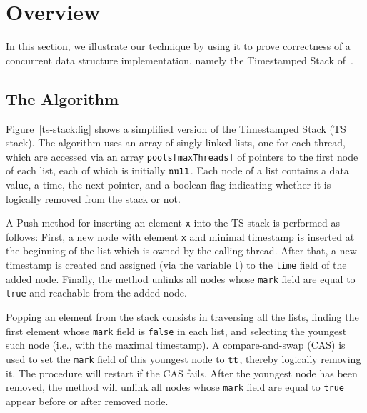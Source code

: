 \section{Overview}
\label{sec:overview}

In this section, we illustrate our technique by using it to prove correctness of
a concurrent data structure implementation, namely the Timestamped Stack
of~\cite{ts-stack}.

\subsection{The Algorithm}



Figure~\ref{ts-stack:fig} shows a simplified version of the Timestamped Stack (TS stack).
The algorithm uses an array of singly-linked lists, one for each thread, which are accessed via
an array {\tt pools[maxThreads]} of pointers to the first node of each list, each
of which is initially ${\tt null}$.
Each node of a list contains a data value, a time, the next pointer, and a boolean flag indicating whether it is logically removed from the stack or not.

A Push method for inserting an element {\tt x} into the TS-stack is performed as follows: First, a new node with element {\tt x} and minimal timestamp is inserted
at the beginning of the list which is owned by the calling thread.
After that, a new timestamp is created and assigned (via
the variable {\tt t}) to the {\tt time} field of the added node.
 
Finally, the method unlinks all nodes whose {\tt mark} field are equal to {\tt true} and reachable from the added node.

Popping an element from the stack consists in traversing all the lists, finding
the first element whose {\tt mark} field is {\tt false} in each
list, and selecting the youngest such node (i.e., with the maximal timestamp).
A compare-and-swap (CAS) is used
to set the {\tt mark} field of this youngest node to ${\tt tt}$,
thereby logically removing it.
The procedure will restart if the CAS fails. After the youngest node has been removed, the method will unlink all nodes whose {\tt mark} field are equal to {\tt true} appear before or after removed  node.
 

